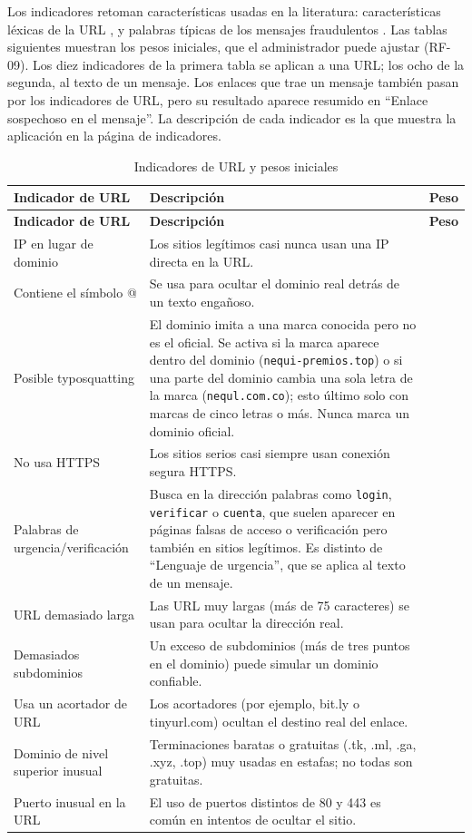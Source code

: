 \documentclass[journal,onecolumn,12pt,draftclsnofoot]{IEEEtran}
\begin{document}
Los indicadores retoman características usadas en la literatura: características léxicas de la URL \cite{hong}, \cite{jeeva} y palabras típicas de los mensajes fraudulentos \cite{yeboah}. Las tablas siguientes muestran los pesos iniciales, que el administrador puede ajustar (RF-09). Los diez indicadores de la primera tabla se aplican a una URL; los ocho de la segunda, al texto de un mensaje. Los enlaces que trae un mensaje también pasan por los indicadores de URL, pero su resultado aparece resumido en ``Enlace sospechoso en el mensaje''. La descripción de cada indicador es la que muestra la aplicación en la página de indicadores.

\begingroup
\footnotesize
\setlength{\tabcolsep}{3pt}
\begin{longtable}{|>{\raggedright\arraybackslash}p{}|>{\raggedright\arraybackslash}p{}|>{\raggedright\arraybackslash}p{}|}
\caption{Indicadores de URL y pesos iniciales}\label{tab:indurl}\\
\hline
\textbf{Indicador de URL} & \textbf{Descripción} & \textbf{Peso} \\ \hline
\endfirsthead
\hline
\textbf{Indicador de URL} & \textbf{Descripción} & \textbf{Peso} \\ \hline
\endhead
IP en lugar de dominio & Los sitios legítimos casi nunca usan una IP directa en la URL. & 25 \\ \hline
Contiene el símbolo @ & Se usa para ocultar el dominio real detrás de un texto engañoso. & 20 \\ \hline
Posible typosquatting & El dominio imita a una marca conocida pero no es el oficial. Se activa si la marca aparece dentro del dominio (\texttt{nequi-premios.top}) o si una parte del dominio cambia una sola letra de la marca (\texttt{nequl.com.co}); esto último solo con marcas de cinco letras o más. Nunca marca un dominio oficial. & 20 \\ \hline
No usa HTTPS & Los sitios serios casi siempre usan conexión segura HTTPS. & 15 \\ \hline
Palabras de urgencia/verificación & Busca en la dirección palabras como \texttt{login}, \texttt{verificar} o \texttt{cuenta}, que suelen aparecer en páginas falsas de acceso o verificación pero también en sitios legítimos. Es distinto de ``Lenguaje de urgencia'', que se aplica al texto de un mensaje. & 10 \\ \hline
URL demasiado larga & Las URL muy largas (más de 75 caracteres) se usan para ocultar la dirección real. & 10 \\ \hline
Demasiados subdominios & Un exceso de subdominios (más de tres puntos en el dominio) puede simular un dominio confiable. & 10 \\ \hline
Usa un acortador de URL & Los acortadores (por ejemplo, bit.ly o tinyurl.com) ocultan el destino real del enlace. & 10 \\ \hline
Dominio de nivel superior inusual & Terminaciones baratas o gratuitas (.tk, .ml, .ga, .xyz, .top) muy usadas en estafas; no todas son gratuitas. & 10 \\ \hline
Puerto inusual en la URL & El uso de puertos distintos de 80 y 443 es común en intentos de ocultar el sitio. & 10 \\ \hline
\end{longtable}
\end{document}
